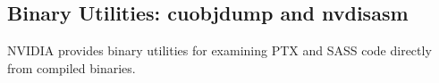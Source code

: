 \subsection{Binary Utilities: cuobjdump and nvdisasm}

NVIDIA provides binary utilities for examining PTX and SASS code directly from compiled binaries.

